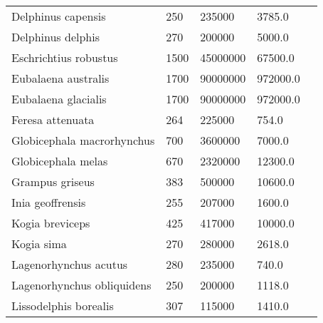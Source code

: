 \begin{longtable}{|p{2.1in}p{0.5in}p{1.0in}p{1.0in}p{1.5in}|}
          Delphinus capensis  &          250 &      235000  &       3785.0   &                       \citet{jefferson2008,ross1979} \\
           Delphinus delphis  &          270 &      200000  &       5000.0   &                                \citet{jefferson2008} \\
       Eschrichtius robustus  &         1500 &    45000000  &      67500.0   &                                  \citet{tomilin1967} \\
         Eubalaena australis  &         1700 &    90000000  &     972000.0   &                                     \citet{best2001} \\
         Eubalaena glacialis  &         1700 &    90000000  &     972000.0   &                                     \citet{best2001} \\
            Feresa attenuata  &          264 &      225000  &        754.0   &                                \citet{jefferson2008} \\
  Globicephala macrorhynchus  &          700 &     3600000  &       7000.0   &                                \citet{jefferson2008} \\
          Globicephala melas  &          670 &     2320000  &      12300.0   &                  \citet{jefferson2008,desportes1993} \\
             Grampus griseus  &          383 &      500000  &      10600.0   &                     \citet{jefferson2008,perrin1984} \\
            Inia geoffrensis  &          255 &      207000  &       1600.0   &                       \citet{jefferson2008,best1989} \\
             Kogia breviceps  &          425 &      417000  &      10000.0   &   \citet{bloodworth2008,caldwell1971,tomilin1967,ruiz1993} \\
                  Kogia sima  &          270 &      280000  &       2618.0   &                                     \citet{ross1979} \\
       Lagenorhynchus acutus  &          280 &      235000  &        740.0   &                                \citet{jefferson2008} \\
  Lagenorhynchus obliquidens  &          250 &      200000  &       1118.0   &                                 \citet{harrison1972} \\
       Lissodelphis borealis  &          307 &      115000  &       1410.0   &                                 \citet{harrison1972} \\

\end{longtable}
